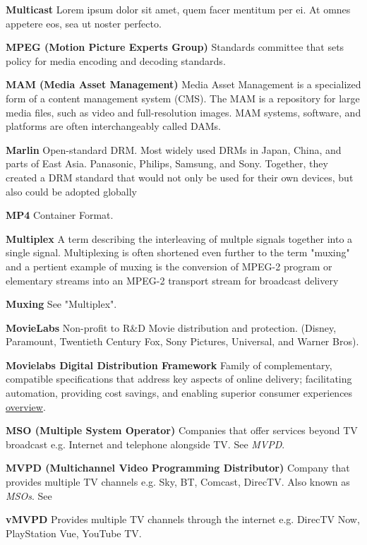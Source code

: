 \smallskip
\textbf{Multicast}
Lorem ipsum dolor sit amet, quem facer mentitum per ei. At omnes appetere eos, sea ut noster perfecto.

\smallskip
\textbf{MPEG (Motion Picture Experts Group)}
Standards committee that sets policy for media encoding and decoding standards.

\smallskip
\textbf{MAM (Media Asset Management)}
Media Asset Management is a specialized form of a content management system (CMS). The MAM is a repository for large media files, such as video and full-resolution images. MAM systems, software, and platforms are often interchangeably called DAMs.

\smallskip
\textbf{Marlin}
Open-standard DRM. Most widely used DRMs in Japan, China, and parts of East Asia. Panasonic, Philips, Samsung, and Sony. Together, they created a DRM standard that would not only be used for their own devices, but also could be adopted globally

\smallskip
\textbf{MP4}
Container Format.

\smallskip
\textbf{Multiplex}
A term describing the interleaving of multple signals together into a single signal. Multiplexing is often shortened even further to the term "muxing" and a pertient example of muxing is the conversion of MPEG-2 program or elementary streams into an MPEG-2 transport stream for broadcast delivery

\smallskip
\textbf{Muxing}
See "Multiplex".

\smallskip
\textbf{MovieLabs}
Non-profit to R\&D Movie distribution and protection. (Disney, Paramount, Twentieth Century Fox, Sony Pictures, Universal, and Warner Bros).

\smallskip
\textbf{Movielabs Digital Distribution Framework}
Family of complementary, compatible specifications that address key aspects of online delivery; facilitating automation, providing cost savings, and enabling superior consumer experiences \href{https://movielabs.com/md/}{overview}.

\smallskip
\textbf{MSO (Multiple System Operator)}
Companies that offer services beyond TV broadcast e.g. Internet and telephone alongside TV.  See \textit{MVPD}.


\smallskip
\textbf{MVPD (Multichannel Video Programming Distributor)}
Company that provides multiple TV channels e.g. Sky, BT, Comcast, DirecTV. Also known as \textit{MSOs}. See

\smallskip
\textbf{vMVPD}
Provides multiple TV channels through the internet e.g. DirecTV Now, PlayStation Vue, YouTube TV.

